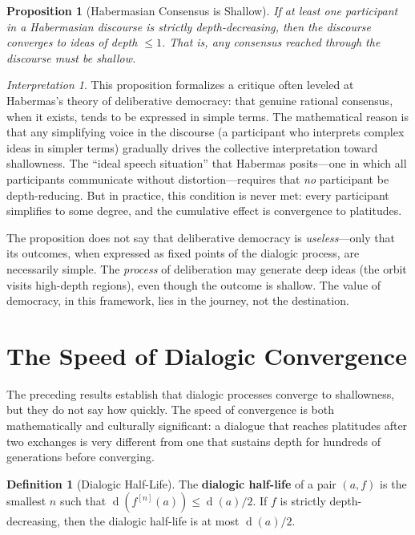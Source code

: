 \documentclass[11pt,openany]{book}
\theoremstyle{definition}
\newtheorem{definition}[axiom]{Definition}
\theoremstyle{plain}
\newtheorem{proposition}[axiom]{Proposition}
\theoremstyle{remark}
\newtheorem{interpretation}[axiom]{Interpretation}
\newcommand{\depth}{\operatorname{d}}       %
\begin{document}
\begin{proposition}[Habermasian Consensus is Shallow]
If at least one participant in a Habermasian discourse is strictly depth-decreasing, then the discourse converges to ideas of depth $\leq 1$. That is, any consensus reached through the discourse must be shallow.
\end{proposition}

\begin{interpretation}
This proposition formalizes a critique often leveled at Habermas's theory of deliberative democracy: that genuine rational consensus, when it exists, tends to be expressed in simple terms. The mathematical reason is that any simplifying voice in the discourse (a participant who interprets complex ideas in simpler terms) gradually drives the collective interpretation toward shallowness. The ``ideal speech situation'' that Habermas posits---one in which all participants communicate without distortion---requires that \emph{no} participant be depth-reducing. But in practice, this condition is never met: every participant simplifies to some degree, and the cumulative effect is convergence to platitudes.

The proposition does not say that deliberative democracy is \emph{useless}---only that its outcomes, when expressed as fixed points of the dialogic process, are necessarily simple. The \emph{process} of deliberation may generate deep ideas (the orbit visits high-depth regions), even though the outcome is shallow. The value of democracy, in this framework, lies in the journey, not the destination.
\end{interpretation}

\section{The Speed of Dialogic Convergence}

The preceding results establish that dialogic processes converge to shallowness, but they do not say how quickly. The speed of convergence is both mathematically and culturally significant: a dialogue that reaches platitudes after two exchanges is very different from one that sustains depth for hundreds of generations before converging.

\begin{definition}[Dialogic Half-Life]
The \textbf{dialogic half-life} of a pair $(a, f)$ is the smallest $n$ such that $\depth(f^{[n]}(a)) \leq \depth(a) / 2$. If $f$ is strictly depth-decreasing, then the dialogic half-life is at most $\depth(a) / 2$.
\end{definition}
\end{document}
